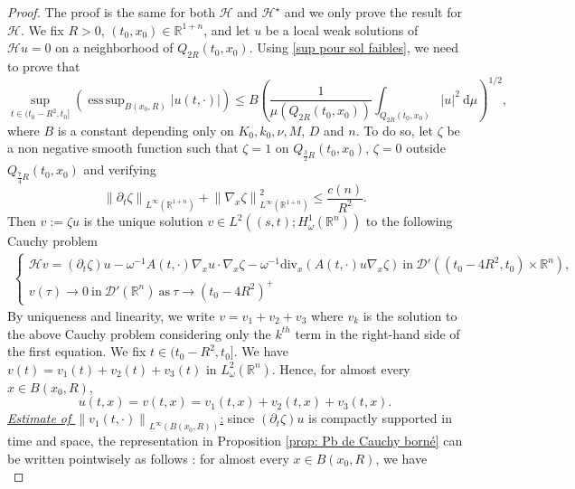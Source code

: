 \documentclass[10pt,a4paper]{amsart}
\DeclareMathOperator*{\supess}{ess\,sup}
\begin{document}
\begin{proof}
The proof is the same for both $\mathcal{H}$ and $\mathcal{H}^\star$ and we only prove the result for $\mathcal{H}$. We fix $R>0$, $(t_0,x_0) \in \mathbb{R}^{1+n}$, and let $u$ be a local weak solutions of $\mathcal{H}u=0$ on a neighborhood of $Q_{2R}(t_0,x_0)$.
Using \eqref{sup pour sol faibles}, we need to prove that 
\begin{equation}\label{JJ}
      \sup_{t \in (t_0-R^2, t_0]} \left ( \supess_{B(x_0,R)} \left | u(t,\cdot) \right | \right )   \leq B \left ( \frac{1}{\mu(Q_{2R}(t_0,x_0))} \int_{Q_{2R}(t_0,x_0)} \left | u \right |^2 \ \mathrm d\mu\right  )^{1/2},
\end{equation}
where $B$ is a constant depending only on $K_0,k_0,\nu,M$, $D$ and $n$. To do so, let $\zeta$ be a non negative smooth function such that $\zeta = 1$ on $Q_{\frac{3}{2}R}(t_0,x_0)$, $\zeta = 0$ outside $Q_{\frac{7}{4}R}(t_0,x_0)$ and verifying $$\left \| \partial_t \zeta  \right \|_{L^\infty(\mathbb{R}^{1+n})}+\left \| \nabla_x \zeta  \right \|^2_{L^\infty(\mathbb{R}^{1+n})} \leq \frac{c(n)}{R^2}.$$
Then $v := \zeta u$ is the unique solution $v \in L^2((s,t);H^1_\omega(\mathbb{R}^n))$ to the  following Cauchy problem
\begin{align*}
\left\{
    \begin{array}{ll}
        \mathcal{H} v = (\partial_t \zeta) u - \omega^{-1}A(t,\cdot)\nabla_x u \cdot \nabla_x \zeta - \omega^{-1}\mathrm{div}_x(A(t,\cdot) u \nabla_x \zeta) \ \mathrm{in} \  \mathcal{D}'((t_0-4R^2,t_0) \times \mathbb{R}^n), \\
        v(\tau) \rightarrow 0 \  \mathrm{ in } \ \mathcal{D'}(\mathbb{R}^n) \ \mathrm{as} \ \tau \rightarrow (t_0-4R^2)^+
    \end{array}
\right.
\end{align*} 
By uniqueness and linearity, we write $v=v_1+v_2+v_3$ where $v_k$ is the solution to the above Cauchy problem considering only the $k^{th}$ term in the right-hand side of the first equation. We fix $ t\in (t_0-R^2,t_0]$. We have $v(t)=v_1(t)+v_2(t)+v_3(t)$ in $L^2_\omega(\mathbb{R}^n)$. Hence, for almost every $x \in B(x_0,R)$,
$$u(t,x)=v(t,x)=v_1(t,x)+v_2(t,x)+v_3(t,x).$$
\underline{\textit{Estimate of $\left\| v_1(t,\cdot) \right\|_{L^\infty(B(x_0,R))}$}:} since $(\partial_t \zeta) u$ is compactly supported in time and space, the representation in Proposition \ref{prop: Pb de Cauchy borné} can be written pointwisely as follows : for almost every $x \in B(x_0,R)$, we have
\begin{equation*}

\end{equation*}
\end{proof}
\end{document}
